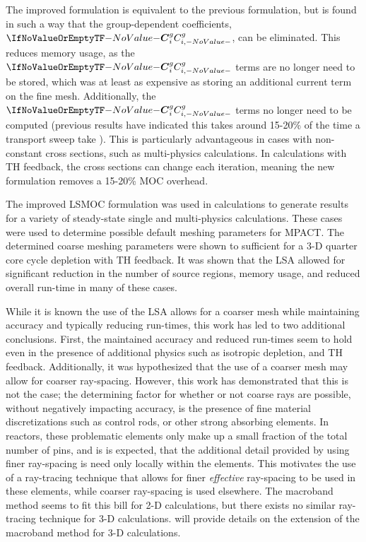{{    The improved formulation is equivalent to the previous formulation, but is found in such a way that the group-dependent coefficients, $\C$, can be eliminated.
    This reduces memory usage, as the $\C$ terms are no longer need to be stored, which was at least as expensive as storing an additional current term on the fine mesh.
    Additionally, the $\C$ terms no longer need to be computed (previous results have indicated this takes around 15-20\% of the time a transport sweep take \cite{Fitzgerald2019}).
    This is particularly advantageous in cases with non-constant cross sections, such as multi-physics calculations.
    In calculations with \ac{TH} feedback, the cross sections can change each iteration, meaning the new formulation removes a 15-20\% \ac{MOC} overhead.

    The improved \ac{LSMOC} formulation was used in calculations to generate results for a variety of steady-state single and multi-physics calculations.
    These cases were used to determine possible default meshing parameters for MPACT.
    The determined coarse meshing parameters were shown to sufficient for a 3-D quarter core cycle depletion with \ac{TH} feedback.
    It was shown that the \ac{LSA} allowed for significant reduction in the number of source regions, memory usage, and reduced overall run-time in many of these cases.

    While it is known the use of the \ac{LSA} allows for a coarser mesh while maintaining accuracy and typically reducing run-times, this work has led to two additional conclusions.
    First, the maintained accuracy and reduced run-times seem to hold even in the presence of additional physics such as isotropic depletion, and \ac{TH} feedback.
    Additionally, it was hypothesized that the use of a coarser mesh may allow for coarser ray-spacing.
    However, this work has demonstrated that this is not the case; the determining factor for whether or not coarse rays are possible, without negatively impacting accuracy, is the presence of fine material discretizations such as control rods, or other strong absorbing elements.
    In reactors, these problematic elements only make up a small fraction of the total number of pins, and is is expected, that the additional detail provided by using finer ray-spacing is need only locally within the elements.
    This motivates the use of a ray-tracing technique that allows for finer \emph{effective} ray-spacing to be used in these elements, while coarser ray-spacing is used elsewhere.
    The macroband method seems to fit this bill for 2-D calculations, but there exists no similar ray-tracing technique for 3-D calculations.
     will provide details on the extension of the macroband method for 3-D calculations.
  }

  \printbibliography
}